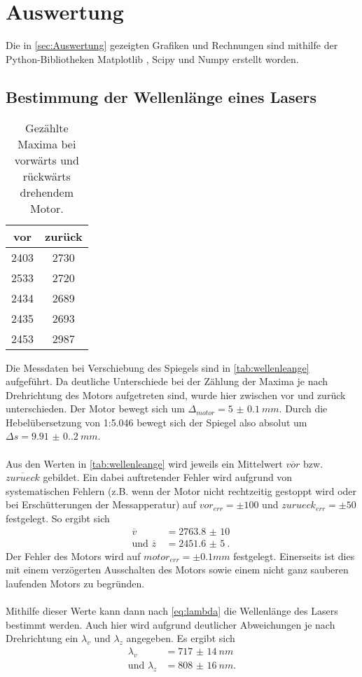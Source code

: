 \section{Auswertung}
\label{sec:Auswertung}
Die in \autoref{sec:Auswertung} gezeigten Grafiken und Rechnungen sind mithilfe der Python-Bibliotheken Matplotlib \cite{matplotlib}, Scipy \cite{scipy} und Numpy \cite{numpy}
erstellt worden.

\subsection{Bestimmung der Wellenlänge eines Lasers}
\begin{table}[H]
  \centering
  \caption{Gezählte Maxima bei vorwärts und rückwärts drehendem Motor.}
  \begin{tabular}{c c}
      \toprule
      vor & zurück\\
      \midrule
      2403 & 2730\\
      2533 & 2720\\
      2434 & 2689\\
      2435 & 2693\\
      2453 & 2987\\
      \bottomrule
  \end{tabular}
  \label{tab:wellenleange}
\end{table}
Die Messdaten bei Verschiebung des Spiegels sind in \autoref{tab:wellenleange} aufgeführt. Da deutliche Unterschiede bei der Zählung der 
Maxima je nach Drehrichtung des Motors aufgetreten sind, wurde hier zwischen vor und zurück unterschieden. Der Motor bewegt sich um 
$\Delta_{motor} = \SI{5(0.1)}{mm}$. Durch die Hebelübersetzung von 1:5.046 bewegt sich der Spiegel also absolut um $\Delta s = \SI{9.91(0.2)}{mm}$.
\\
\\
Aus den Werten in \autoref{tab:wellenleange} wird jeweils ein Mittelwert $\overline{vor}$ bzw. $\overline{zurueck}$ gebildet. Ein dabei auftretender Fehler wird aufgrund von 
systematischen Fehlern (z.B. wenn der Motor nicht rechtzeitig gestoppt wird oder bei Erschütterungen der Messapperatur) auf $vor_{err} = \pm 100$ und $zurueck_{err} = \pm 50$ festgelegt.
So ergibt sich 
\begin{align*}
  \overline{v} &= \SI{2763.8(100)}{}\\
  \text{und } \overline{z}\, &= \SI{2451.6(50)}{}.
\end{align*}
Der Fehler des Motors wird auf $motor_{err} = \pm 0.1 \unit{mm}$ festgelegt. Einerseits ist dies mit einem verzögerten Ausschalten des Motors sowie einem nicht
ganz sauberen laufenden Motors zu begründen.
\\
\\
Mithilfe dieser Werte kann dann nach \autoref{eq:lambda} die Wellenlänge des Lasers bestimmt werden. Auch hier wird aufgrund deutlicher Abweichungen je nach Drehrichtung
ein $\lambda_{v}$ und $\lambda_{z}$ angegeben.
Es ergibt sich 
\begin{align*}
  \lambda_{v} &= \SI{717(14)}{nm}\\
  \text{und } \lambda_{z} &= \SI{808(16)}{nm}.
\end{align*}

